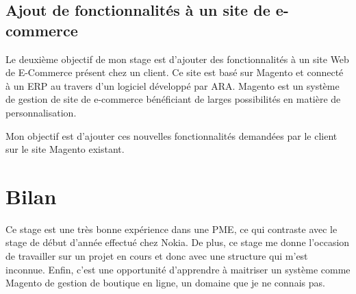 \documentclass{Article}
\begin{document}
\subsection{Ajout de fonctionnalités à un site de e-commerce}

Le deuxième objectif de mon stage est d'ajouter des fonctionnalités à un site Web de E-Commerce présent chez un client. Ce site est basé sur Magento et connecté à un ERP au travers d'un logiciel développé par ARA. Magento est un système de gestion de site de e-commerce bénéficiant de larges possibilités en matière de personnalisation.

Mon objectif est d'ajouter ces nouvelles fonctionnalités demandées par le client sur le site Magento existant.

\section{Bilan}

Ce stage est une très bonne expérience dans une PME, ce qui contraste avec le stage de début d'année effectué chez Nokia. De plus, ce stage me donne l'occasion de travailler sur un projet en cours et donc avec une structure qui m'est inconnue. Enfin, c'est une opportunité d'apprendre à maitriser un système comme Magento de gestion de boutique en ligne, un domaine que je ne connais pas.
\end{document}
